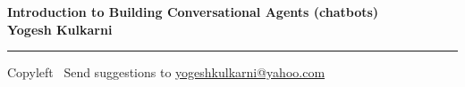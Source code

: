 
\graphicspath{{images/}}

\footnotesize


\begin{center}
\Large{\textbf{Introduction to Building Conversational Agents (chatbots)\\ Yogesh Kulkarni}}  
\end{center}

\begin{multicols}{2}

\end{multicols}

\rule{\linewidth}{0.25pt}
\scriptsize
Copyleft \textcopyleft\  Send suggestions to 
\href{http://www.yogeshkulkarni.com}{yogeshkulkarni@yahoo.com}


